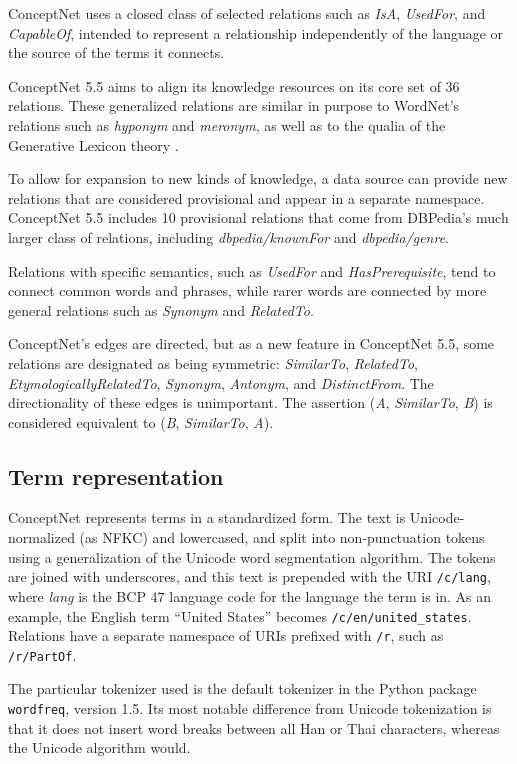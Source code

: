 \documentclass[letterpaper]{article}
\begin{document}
ConceptNet uses a closed class of selected relations such as \emph{IsA},
\emph{UsedFor}, and \emph{CapableOf}, intended to
represent a relationship independently of the language or the source of
the terms it connects.

ConceptNet 5.5 aims to align its knowledge resources on its core set of 36
relations. These generalized relations are similar in purpose to WordNet's
relations such as \emph{hyponym} and \emph{meronym}, as well as to the qualia
of the Generative Lexicon theory \cite{pustejovsky1991generative}.

To allow for expansion to new kinds of knowledge, a data
source can provide new relations that are considered provisional and
appear in a separate namespace. ConceptNet 5.5 includes 10 provisional
relations that come from DBPedia's much larger class of relations,
including \emph{dbpedia/knownFor} and \emph{dbpedia/genre}.

Relations with specific semantics, such as \emph{UsedFor} and
\emph{HasPrerequisite}, tend to connect common words and phrases, while
rarer words are connected by more general relations such as
\emph{Synonym} and \emph{RelatedTo}.

ConceptNet's edges are directed, but as a new feature in ConceptNet 5.5,
some relations are designated as being symmetric: \emph{SimilarTo},
\emph{RelatedTo}, \emph{EtymologicallyRelatedTo}, \emph{Synonym},
\emph{Antonym}, and \emph{DistinctFrom}. The directionality of these
edges is unimportant. The assertion (\emph{A}, \emph{SimilarTo},
\emph{B}) is considered equivalent to (\emph{B}, \emph{SimilarTo},
\emph{A}).


\subsection{Term representation}\label{term-representation}

ConceptNet represents terms in a standardized form. The text is
Unicode-normalized (as NFKC) and lowercased, and split into
non-punctuation tokens using a generalization of the Unicode word
segmentation algorithm. The tokens are joined with underscores, and this
text is prepended with the URI \texttt{/c/lang}, where \emph{lang} is
the BCP 47 language code for the language the term is in. As an example,
the English term ``United States'' becomes
\texttt{/c/en/united\_states}. Relations have a separate namespace of
URIs prefixed with \texttt{/r}, such as \texttt{/r/PartOf}.

The particular tokenizer used is the default tokenizer in the Python
package \texttt{wordfreq}, version 1.5. Its most notable difference from
Unicode tokenization is that it does not insert word breaks between all
Han or Thai characters, whereas the Unicode algorithm would.
\end{document}
